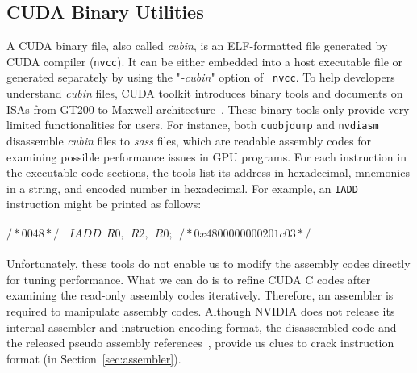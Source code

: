 \subsection{CUDA Binary Utilities}
\label{sec:cuda}

A CUDA binary file, also called {\em cubin}, is an ELF-formatted file generated by CUDA compiler ({\tt nvcc}). It can 
be either embedded into a host executable file or generated separately by using the "{\em -cubin}" option of {\tt 
nvcc}. To help developers understand {\em cubin} files, CUDA toolkit introduces binary tools and documents on ISAs from 
GT200 to Maxwell architecture~\cite{gtx980}. These binary tools only provide very limited functionalities for users. 
For instance, both {\tt cuobjdump} and {\tt nvdiasm} disassemble {\em cubin} files to {\em sass} files, which are 
readable assembly codes for examining possible performance issues in GPU programs. For each instruction in the 
executable code sections, the tools list its address in hexadecimal, mnemonics in a string, and encoded number in 
hexadecimal. For example, an {\tt IADD} instruction might be printed as follows: \\\\
$/*0048*/~~~~IADD~~R0,~~R2,~~R0;~~/* 0x4800000000201c03 */$\\\\
Unfortunately, these tools do not enable us to modify the assembly codes directly for tuning performance. What we can 
do is to refine CUDA C codes after examining the read-only assembly codes iteratively. Therefore, an assembler is 
required to manipulate assembly codes. Although NVIDIA does not release its internal assembler and instruction encoding 
format, the disassembled code and the released pseudo assembly references~\cite{ptx2015isa}, provide us clues to crack 
instruction format (in Section~\ref{sec:assembler}).

